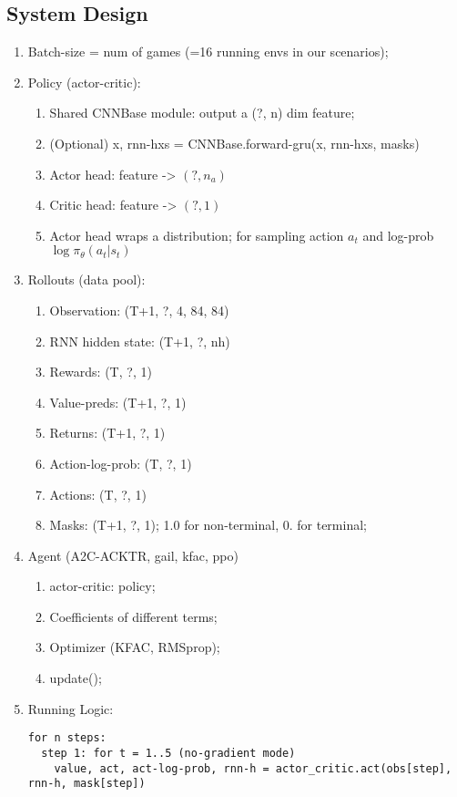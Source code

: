 \documentclass{article}
\begin{document}
\subsection{System Design}
\begin{enumerate}
\item Batch-size = num of games (=16 running envs in our scenarios);
\item Policy (actor-critic):
  \begin{enumerate}
  \item Shared CNNBase module: output a (?, n) dim feature;
  \item (Optional) x, rnn-hxs = CNNBase.forward-gru(x, rnn-hxs, masks)
  \item Actor head: feature -> $(?, n_{a})$
  \item Critic head: feature -> $(?, 1)$
  \item Actor head wraps a distribution; for sampling action $a_t$ and log-prob $\log\pi_{\theta}(a_t|s_t)$
  \end{enumerate}
\item Rollouts (data pool):
  \begin{enumerate}
  \item Observation: (T+1, ?, 4, 84, 84)
  \item RNN hidden state: (T+1, ?, nh)
  \item Rewards: (T, ?, 1)
  \item Value-preds: (T+1, ?, 1)
  \item Returns: (T+1, ?, 1)
  \item Action-log-prob: (T, ?, 1)
  \item Actions: (T, ?, 1)
  \item Masks: (T+1, ?, 1); 1.0 for non-terminal, 0. for terminal;
  \end{enumerate}
\item Agent (A2C-ACKTR, gail, kfac, ppo)
  \begin{enumerate}
  \item actor-critic: policy;
  \item Coefficients of different terms;
  \item Optimizer (KFAC, RMSprop);
  \item update();
  \end{enumerate}
\item Running Logic:
\begin{verbatim}
for n steps:
  step 1: for t = 1..5 (no-gradient mode)
    value, act, act-log-prob, rnn-h = actor_critic.act(obs[step], rnn-h, mask[step])

\end{verbatim}
\end{enumerate}
\end{document}
